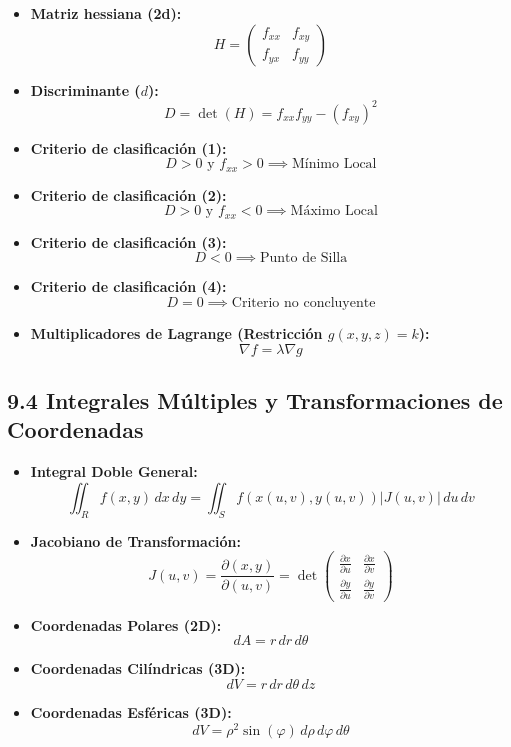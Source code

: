 \documentclass[11pt,a4paper]{article}
\begin{document}
\begin{itemize}
  \item \textbf{Matriz hessiana (2d):}
  \[
    H = \begin{pmatrix} f_{xx} & f_{xy} \\ f_{yx} & f_{yy} \end{pmatrix}
  \]
  \item \textbf{Discriminante ($d$):}
  \[
    D = \det(H) = f_{xx} f_{yy} - (f_{xy})^2
  \]
  \item \textbf{Criterio de clasificación (1):}
  \[
    D > 0 \text{ y } f_{xx} > 0 \implies \text{Mínimo Local}
  \]
  \item \textbf{Criterio de clasificación (2):}
  \[
    D > 0 \text{ y } f_{xx} < 0 \implies \text{Máximo Local}
  \]
  \item \textbf{Criterio de clasificación (3):}
  \[
    D < 0 \implies \text{Punto de Silla}
  \]
  \item \textbf{Criterio de clasificación (4):}
  \[
    D = 0 \implies \text{Criterio no concluyente}
  \]
  \item \textbf{Multiplicadores de Lagrange (Restricción $g(x,y,z) = k$):}
  \[
    \nabla f = \lambda \nabla g
  \]
\end{itemize}

\subsection*{9.4 Integrales Múltiples y Transformaciones de Coordenadas}

\begin{itemize}
  \item \textbf{Integral Doble General:}
  \[
    \iint_R f(x, y) \, dx \, dy = \iint_S f(x(u,v), y(u,v)) |J(u, v)| \, du \, dv
  \]
  \item \textbf{Jacobiano de Transformación:}
  \[
    J(u, v) = \frac{\partial(x, y)}{\partial(u, v)} = \det\begin{pmatrix} \frac{\partial x}{\partial u} & \frac{\partial x}{\partial v} \\ \frac{\partial y}{\partial u} & \frac{\partial y}{\partial v} \end{pmatrix}
  \]
  \item \textbf{Coordenadas Polares (2D):}
  \[
    dA = r \, dr \, d\theta
  \]
  \item \textbf{Coordenadas Cilíndricas (3D):}
  \[
    dV = r \, dr \, d\theta \, dz
  \]
  \item \textbf{Coordenadas Esféricas (3D):}
  \[
    dV = \rho^2 \sin(\varphi) \, d\rho \, d\varphi \, d\theta
  \]
\end{itemize}
\end{document}
